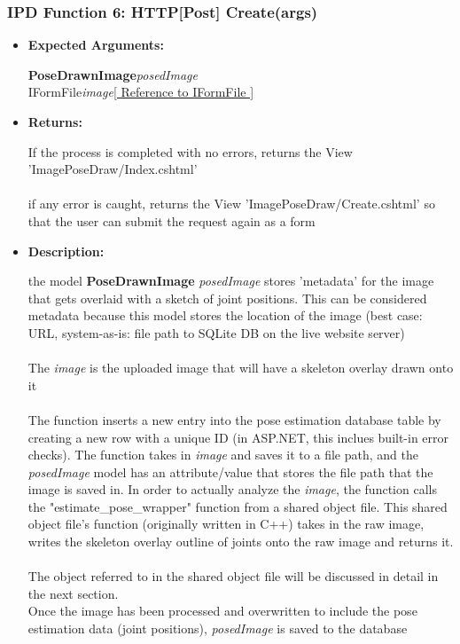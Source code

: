 \documentclass{scrreprt}
\begin{document}
\subsubsection{IPD Function 6: HTTP[Post] Create(args)}
\begin{itemize}
    \item \textbf{Expected Arguments:}

    \textbf{PoseDrawnImage}\quad\textit{posedImage}
    \\
    IFormFile\quad\textit{image}\quad\quad\quad\href{https://docs.microsoft.com/en-us/aspnet/core/api/microsoft.aspnetcore.http.iformfile}{[ Reference to IFormFile ]}

    \item \textbf{Returns:}

    If the process is completed with no errors, returns the View 'ImagePoseDraw/Index.cshtml'
    \\\\
    if any error is caught, returns the View 'ImagePoseDraw/Create.cshtml' so that the user can submit the request again as a form

    \item \textbf{Description:}

    the model \textbf{PoseDrawnImage} \textit{posedImage} stores 'metadata' for the image that gets overlaid with a sketch of joint positions. This can be considered metadata because this model stores the location of the image (best case: URL, system-as-is: file path to SQLite DB on the live website server)
    \\\\
    The \textit{image} is the uploaded image that will have a skeleton overlay drawn onto it
    \\\\
    The function inserts a new entry into the pose estimation database table by creating a new row with a unique ID (in ASP.NET, this inclues built-in error checks). The function takes in \textit{image} and saves it to a file path, and the \textit{posedImage} model has an attribute/value that stores the file path that the image is saved in. In order to actually analyze the \textit{image}, the function calls the "estimate\_pose\_wrapper" function from a shared object file. This shared object file's function (originally written in C++) takes in the raw image, writes the skeleton overlay outline of joints onto the raw image and returns it.
    \\\\
    The object referred to in the shared object file will be discussed in detail in the next section.
    \\
    Once the image has been processed and overwritten to include the pose estimation data (joint positions), \textit{posedImage} is saved to the database
\end{itemize}
\end{document}
